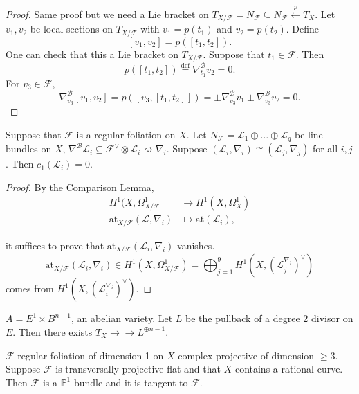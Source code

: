 \begin{proof}
Same proof but we need a Lie bracket on
$T_{X/\mathcal{F}}=N_{\mathcal{F}}\subseteq
N_{\mathcal{F}}\overset{p}{\leftarrow}T_X$.
Let $v_1,v_2$ be local sections on
$T_{X/\mathcal{F}}$
with $v_1=p(t_1)$ and $v_2=p(t_2)$.
Define
$$
[v_1,v_2]=p([t_1,t_2]).
$$
One can check that this a Lie bracket on
$T_{X/\mathcal{F}}$.
Suppose that $t_1 \in \mathcal{F}$. Then
$$
p([t_1,t_2])\overset{\text{def}}{=}
\nabla_{t_1}^{\mathcal{B}}v_2=0.
$$
For $v_3 \in \mathcal{F}$,
$$
\nabla_{v_3}^{\mathcal{B}}[v_1,v_2]
=p([v_3,[t_1,t_2]])=\pm\nabla_{v_3}
^{\mathcal{B}}v_1\pm
\nabla_{v_3}^{\mathcal{B}}v_2=0.
$$
\end{proof}

\begin{lemma}
\label{lemma-vanishing-chern-class}
Suppose that $\mathcal{F}$ is a regular
foliation on $X$.
Let $N_{\mathcal{F}}=\mathcal{L}_1 \oplus
\ldots \oplus \mathcal{L}_q$
be line bundles on $X$,
$\nabla^{\mathcal{B}}\mathcal{L}_i\subseteq
\mathcal{F}^\vee\otimes\mathcal{L}
_i\rightsquigarrow
\nabla_i$.
Suppose
$(\mathcal{L}_i,\nabla_i)\cong(\mathcal{L}_j,
\nabla_j)$
for all $i,j$.
Then $c_1(\mathcal{L}_i)=0$.
\end{lemma}

\begin{proof}
By the Comparison Lemma,
$$
\begin{aligned}
H^1(X,\Omega_{X/\mathcal{F}}^1
&\longrightarrow H^1(X,\Omega_X^1) \\
\text{at}_{X/\mathcal{F}}(\mathcal{L},
\nabla_i)
&\longmapsto
\text{at}(\mathcal{L}_i),
\end{aligned}
$$

\noindent
it suffices to prove that
$\text{at}_{X/\mathcal{F}}(\mathcal{L}_i,
\nabla_i)$
vanishes.
$$
\text{at}_{X/\mathcal{F}}(\mathcal{L}_i,
\nabla_i)
\in H^1(X,\Omega_{X/\mathcal{F}}^1)
=\bigoplus_{j=1}^9
H^1(X,(\mathcal{L}_j^{\nabla_j})^\vee)
$$
comes from
$H^1(X,(\mathcal{L}_i^{\nabla_i})^\vee)$.
\end{proof}

\begin{example}
\label{example-degree-2-line-bundle-on-e}
$A=E^1 \times B^{n-1}$, an abelian variety.
Let $ L$ be the pullback of a degree 2
divisor on $E$.
Then there exists  $T_X
\to\!\!\!\!\!\to L^{\oplus n-1}$.
\end{example}

\begin{proposition}
\label{proposition-}
$\mathcal{F}$ regular foliation of dimension
1 on $X$ complex projective
of dimension $\geq 3$.
Suppose $\mathcal{F}$ is transversally
projective flat
and that $X$ contains a rational curve.
Then $\mathcal{F}$ is a $\mathbb{P}^1$-bundle
and it is tangent
to $\mathcal{F}$.
\end{proposition}

